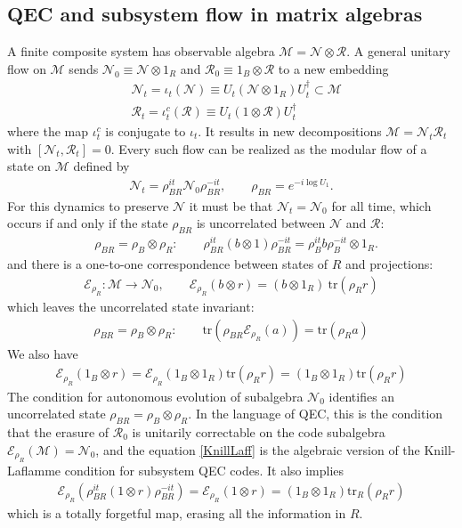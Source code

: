 \documentclass[a4paper,11pt]{article}
\theoremstyle{definition}
\newcommand{\nn}{\nonumber}
\newcommand{\tr}{\text{tr}}
\newcommand{\mE}{\mathcal{E}}
\begin{document}
\subsection{QEC and subsystem flow in matrix algebras}
A finite composite system has observable algebra $\mathcal M=\mathcal N\otimes\mathcal R$. A general unitary flow on $\mathcal M$ sends $\mathcal N_0\equiv \mathcal N\otimes 1_R$ and $\mathcal R_0\equiv 1_B\otimes \mathcal R$ to a new embedding
\begin{align}
&\mathcal N_t=\iota_t(\mathcal N)\equiv U_t(\mathcal N\otimes 1_R)U_t^\dagger\subset\mathcal M  \nn\\
&\mathcal R_t=\iota_t^c(\mathcal R)\equiv U_t(1\otimes \mathcal R)U_t^\dagger
\end{align}
where the map $\iota_t^c$ is conjugate to $\iota_t$. It results in new decompositions $\mathcal M=\mathcal N_t\mathcal R_t$ with $[\mathcal N_t,\mathcal R_t]=0$.
Every such flow can be realized as the modular flow of a state on $\mathcal M$ defined by
\begin{align}
    \mathcal N_t=\rho_{BR}^{it}\mathcal N_0\rho_{BR}^{-it},\qquad \rho_{BR}=e^{-i\log U_1}.
\end{align}
For this dynamics to preserve $\mathcal N$ it must be that $\mathcal N_t=\mathcal N_0$ for all time, which occurs if and only if the state $\rho_{BR}$ is uncorrelated between $\mathcal N$ and $\mathcal R$:
\begin{align}
 &   \rho_{BR}=\rho_B\otimes \rho_R:\qquad     \rho_{BR}^{it}(b\otimes 1)\rho_{BR}^{-it}=\rho_B^{it}b\rho_B^{-it}\otimes 1_R.
\end{align}
and there is a one-to-one correspondence between states of $R$ and projections:
\begin{align}
    \mE_{\rho_R}:\mathcal M\to \mathcal N_0, \qquad \mE_{\rho_R}(b\otimes r)=(b\otimes 1_R)\: \tr(\rho_R r)
\end{align}
which leaves the uncorrelated state invariant:
\begin{align}
    \rho_{BR}=\rho_B\otimes \rho_R:\qquad \tr(\rho_{BR}\mE_{\rho_R}(a))=\tr(\rho_R a)
\end{align}
We also have
\begin{align}\label{KnillLaff}
    \mE_{\rho_R}(1_B\otimes r)=\mE_{\rho_R}(1_B\otimes 1_R)\tr(\rho_R r)=(1_B\otimes 1_R)\tr(\rho_R r)
\end{align}
The condition for autonomous evolution of subalgebra $\mathcal N_0$ identifies an uncorrelated state $\rho_{BR}=\rho_B\otimes \rho_R$. In the language of QEC, this is the condition that the erasure of $\mathcal R_0$ is unitarily correctable on the code subalgebra $\mE_{\rho_R}(\mathcal M)=\mathcal N_0$, and the equation \eqref{KnillLaff} is the algebraic version of the Knill-Laflamme condition for subsystem QEC codes. It also implies 
\begin{align}
    \mE_{\rho_R}(\rho_{BR}^{it}(1\otimes r)\rho_{BR}^{-it})=\mE_{\rho_R}(1\otimes r)=(1_B\otimes 1_R)\tr_R(\rho_R r)
\end{align}
which is a totally forgetful map, erasing all the information in $R$. 
\end{document}
